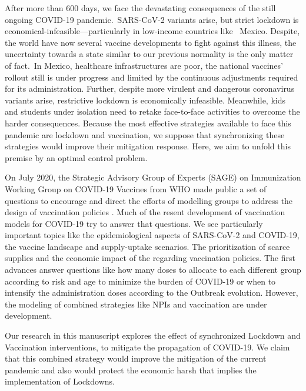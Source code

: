 
    After more than 600 days, we face the devastating consequences of the still
ongoing COVID-19 pandemic. SARS-CoV-2 variants arise, but strict lockdown
is economical-infeasible---particularly in low-income countries like  Mexico.
Despite, the world have now several vaccine developments to fight against this
illness, the uncertainty towards a state similar to our previous normality is
the only matter of fact. In Mexico, healthcare infrastructures are poor, the
national vaccines' rollout still is under progress and limited by the
continuous adjustments required for its administration. Further, despite more
virulent and dangerous coronavirus variants arise, restrictive lockdown
is economically infeasible. Meanwhile, kids and students under isolation need
to retake face-to-face activities to overcome the harder consequences.
Because the most effective strategies available to face this pandemic are
lockdown and vaccination, we suppose that synchronizing these strategies would
improve their mitigation response. Here, we aim to unfold this premise by an
optimal control problem.
%

    On July 2020, the Strategic Advisory Group of Experts (SAGE) on
Immunization Working Group on COVID-19 Vaccines from WHO made public a set of
questions to encourage and direct the efforts of modelling groups to address
the design of vaccination policies \cite{sage2020}. Much of the  resent
development of vaccination models for COVID-19 try to  answer that questions.
We see particularly important topics like the epidemiological aspects of
SARS-CoV-2 and COVID-19, the vaccine landscape and supply-uptake scenarios.
The prioritization of scarce supplies and the economic impact of the regarding
vaccination policies. The first advances answer questions like how many
doses to allocate to each different group according to risk and age to minimize
the burden of COVID-19 or when to intensify the administration doses according
to the Outbreak evolution. However, the modeling of combined strategies like
NPIs and vaccination are under development.

    Our research in this manuscript explores the effect of synchronized Lockdown
and Vaccination interventions, to mitigate the  propagation of COVID-19.
We claim that this combined strategy would improve the mitigation of the
current pandemic and also would protect the economic harsh that implies the
implementation of Lockdowns.

